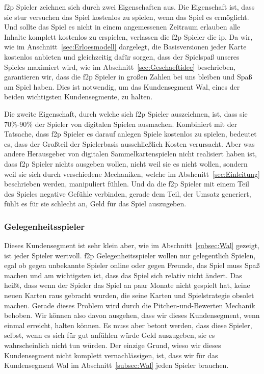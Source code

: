 \documentclass[fontsize=12, a4aper]{scrartcl}
\begin{document}
\acl{f2p} Spieler zeichnen sich durch zwei Eigenschaften aus. Die Eigenschaft ist, dass sie stur versuchen das Spiel kostenlos zu spielen, wenn das Spiel es ermöglicht. Und sollte das Spiel es nicht in einem angemessenen Zeitraum erlauben alle Inhalte komplett kostenlos zu erspielen, verlassen die \ac{f2p} Spieler die \ac{ip}. Da wir, wie im Anschnitt~\ref{sec:Erloesmodell} dargelegt, die Basisversionen jeder Karte kostenlos anbieten und gleichzeitig dafür sorgen, dass der Spielspaß unseres Spieles maximiert wird, wie im Abschnitt~\ref{sec:Geschaeftidee} beschrieben, garantieren wir, dass die \ac{f2p} Spieler in großen Zahlen bei uns bleiben und Spaß am Spiel haben. Dies ist notwendig, um das Kundensegment \glqq Wal\grqq, eines der beiden wichtigsten Kundensegmente, zu halten.\hfill\newline

\noindent Die zweite Eigenschaft, durch welche sich \ac{f2p} Spieler auszeichnen, ist, dass sie 70\%-90\% der Spieler von digitalen Spielen ausmachen. Kombiniert mit der Tatsache, dass \ac{f2p} Spieler es darauf anlegen Spiele kostenlos zu spielen, bedeutet es, dass der Großteil der Spielerbasis ausschließlich Kosten verursacht. Aber was andere Herausgeber von digitalen Sammelkartenspielen nicht realisiert haben ist, dass \ac{f2p} Spieler nichts ausgeben wollen, nicht weil sie es nicht wollen, sondern weil sie sich durch verschiedene Mechaniken, welche im Abshcnitt~\ref{sec:Einleitung} beschrieben werden, manipuliert fühlen. Und da die \ac{f2p} Spieler mit einem Teil des Spieles negative Gefühle verbinden, gerade dem Teil, der Umsatz generiert, fühlt es für sie schlecht an, Geld für das Spiel auszugeben. 

\subsubsection{Gelegenheitsspieler} \label{subsubsec:f2p_Spieler_Gelegenheitsspieler}

Dieses Kundensegment ist sehr klein aber, wie im Abschnitt~\ref{subsec:Wal} gezeigt, ist jeder Spieler wertvoll. \ac{f2p} Gelegenheitsspieler wollen nur gelegentlich Spielen, egal ob gegen unbekannte Spieler online oder gegen Freunde, das Spiel muss Spaß machen und am wichtigsten ist, dass das Spiel sich relativ nicht ändert. Das heißt, dass wenn der Spieler das Spiel an paar Monate nicht gespielt hat, keine neuen Karten raus gebracht wurden, die seine Karten und Spielstrategie obsolet machen. Gerade dieses Problem wird durch die Pitchen-und-Bewerten Mechanik behoben. Wir können also davon ausgehen, dass wir dieses Kundensegment, wenn einmal erreicht, halten können. Es muss aber betont werden, dass diese Spieler, selbst, wenn es sich für gut anfühlen würde Geld auszugeben, sie es wahrscheinlich nicht tun würden. Der einzige Grund, wieso wir dieses Kundensegment nicht komplett vernachlässigen, ist, dass wir für das Kundensegment \glqq Wal\grqq{} im Abschnitt~\ref{subsec:Wal} jeden Spieler brauchen.
\end{document}
